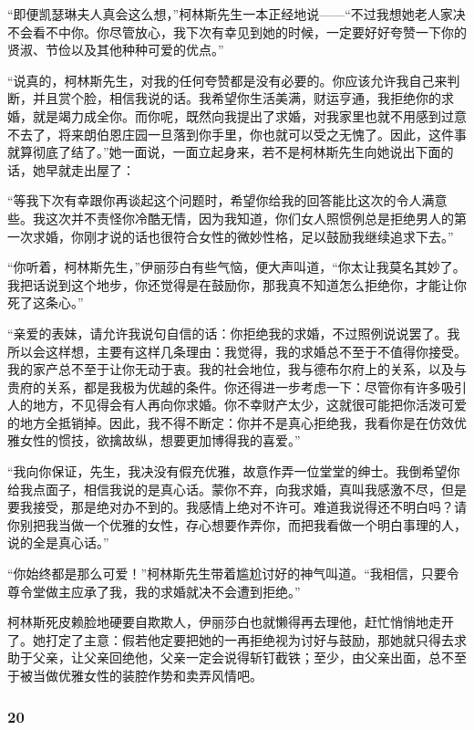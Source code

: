 \par “即便凯瑟琳夫人真会这么想，”柯林斯先生一本正经地说——“不过我想她老人家决不会看不中你。你尽管放心，我下次有幸见到她的时候，一定要好好夸赞一下你的贤淑、节俭以及其他种种可爱的优点。”
\par “说真的，柯林斯先生，对我的任何夸赞都是没有必要的。你应该允许我自己来判断，并且赏个脸，相信我说的话。我希望你生活美满，财运亨通，我拒绝你的求婚，就是竭力成全你。而你呢，既然向我提出了求婚，对我家里也就不用感到过意不去了，将来朗伯恩庄园一旦落到你手里，你也就可以受之无愧了。因此，这件事就算彻底了结了。”她一面说，一面立起身来，若不是柯林斯先生向她说出下面的话，她早就走出屋了：
\par “等我下次有幸跟你再谈起这个问题时，希望你给我的回答能比这次的令人满意些。我这次并不责怪你冷酷无情，因为我知道，你们女人照惯例总是拒绝男人的第一次求婚，你刚才说的话也很符合女性的微妙性格，足以鼓励我继续追求下去。”
\par “你听着，柯林斯先生，”伊丽莎白有些气恼，便大声叫道，“你太让我莫名其妙了。我把话说到这个地步，你还觉得是在鼓励你，那我真不知道怎么拒绝你，才能让你死了这条心。”
\par “亲爱的表妹，请允许我说句自信的话：你拒绝我的求婚，不过照例说说罢了。我所以会这样想，主要有这样几条理由：我觉得，我的求婚总不至于不值得你接受。我的家产总不至于让你无动于衷。我的社会地位，我与德布尔府上的关系，以及与贵府的关系，都是我极为优越的条件。你还得进一步考虑一下：尽管你有许多吸引人的地方，不见得会有人再向你求婚。你不幸财产太少，这就很可能把你活泼可爱的地方全抵销掉。因此，我不得不断定：你并不是真心拒绝我，我看你是在仿效优雅女性的惯技，欲擒故纵，想要更加博得我的喜爱。”
\par “我向你保证，先生，我决没有假充优雅，故意作弄一位堂堂的绅士。我倒希望你给我点面子，相信我说的是真心话。蒙你不弃，向我求婚，真叫我感激不尽，但是要我接受，那是绝对办不到的。我感情上绝对不许可。难道我说得还不明白吗？请你别把我当做一个优雅的女性，存心想要作弄你，而把我看做一个明白事理的人，说的全是真心话。”
\par “你始终都是那么可爱！”柯林斯先生带着尴尬讨好的神气叫道。“我相信，只要令尊令堂做主应承了我，我的求婚就决不会遭到拒绝。”
\par 柯林斯死皮赖脸地硬要自欺欺人，伊丽莎白也就懒得再去理他，赶忙悄悄地走开了。她打定了主意：假若他定要把她的一再拒绝视为讨好与鼓励，那她就只得去求助于父亲，让父亲回绝他，父亲一定会说得斩钉截铁；至少，由父亲出面，总不至于被当做优雅女性的装腔作势和卖弄风情吧。



\subsubsection*{20}

